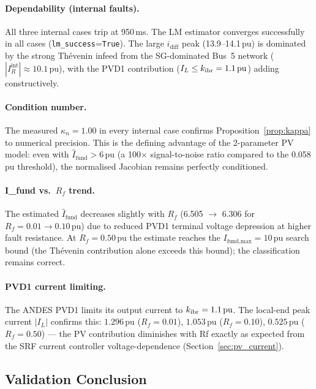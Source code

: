 \documentclass[11pt, a4paper]{article}
\newcommand{\kn}{\kappa_n}
\newcommand{\kIBR}{k_{\rm ibr}}
\begin{document}
\paragraph{Dependability (internal faults).}
All three internal cases trip at 950\,ms.  The LM estimator converges successfully
in all cases (\texttt{lm\_success}=\texttt{True}).  The large $i_\text{diff}$ peak
(13.9--14.1\,pu) is dominated by the strong Th\'evenin infeed from the SG-dominated
Bus~5 network ($|I_R^\text{int}| \approx 10.1\,\text{pu}$), with the PVD1
contribution ($I_L \leq \kIBR = 1.1\,\text{pu}$) adding constructively.

\paragraph{Condition number.}
The measured $\kn = 1.00$ in every internal case confirms
Proposition~\ref{prop:kappa} to numerical precision.  This is the defining
advantage of the 2-parameter PV model: even with $\hat{I}_\text{fund} > 6\,\text{pu}$
(a 100$\times$ signal-to-noise ratio compared to the 0.058\,pu threshold), the
normalised Jacobian remains perfectly conditioned.

\paragraph{I\_fund vs.\ $R_f$ trend.}
The estimated $\hat{I}_\text{fund}$ decreases slightly with $R_f$
(6.505 $\to$ 6.306 for $R_f = 0.01 \to 0.10\,\text{pu}$) due to reduced PVD1
terminal voltage depression at higher fault resistance.  At $R_f = 0.50\,\text{pu}$
the estimate reaches the $I_\text{fund,max} = 10\,\text{pu}$ search bound
(the Th\'evenin contribution alone exceeds this bound);
the classification remains correct.

\paragraph{PVD1 current limiting.}
The ANDES PVD1 limits its output current to $\kIBR = 1.1\,\text{pu}$.  The
local-end peak current $|I_L|$ confirms this:
$1.296\,\text{pu}$ ($R_f = 0.01$), $1.053\,\text{pu}$ ($R_f = 0.10$),
$0.525\,\text{pu}$ ($R_f = 0.50$) — the PV contribution diminishes with Rf exactly as
expected from the SRF current controller voltage-dependence (Section~\ref{sec:pv_current}).

\subsection{Validation Conclusion}
\end{document}
